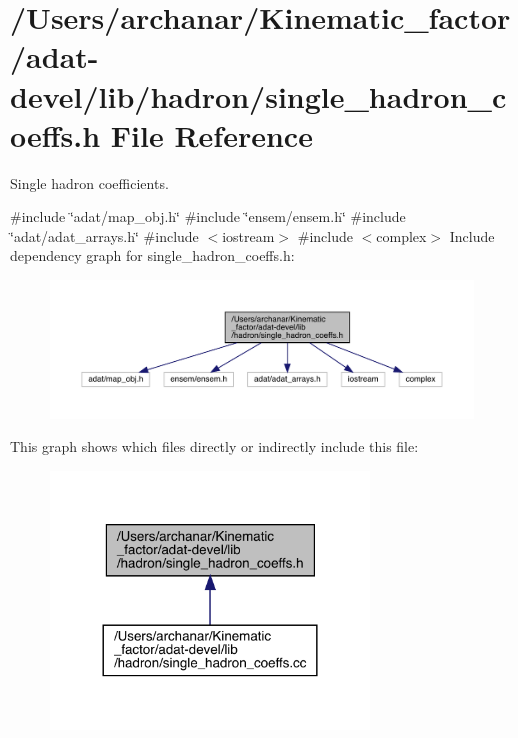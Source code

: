 \hypertarget{adat-devel_2lib_2hadron_2single__hadron__coeffs_8h}{}\section{/\+Users/archanar/\+Kinematic\+\_\+factor/adat-\/devel/lib/hadron/single\+\_\+hadron\+\_\+coeffs.h File Reference}
\label{adat-devel_2lib_2hadron_2single__hadron__coeffs_8h}


Single hadron coefficients.  


{\ttfamily \#include \char`\"{}adat/map\+\_\+obj.\+h\char`\"{}}\newline
{\ttfamily \#include \char`\"{}ensem/ensem.\+h\char`\"{}}\newline
{\ttfamily \#include \char`\"{}adat/adat\+\_\+arrays.\+h\char`\"{}}\newline
{\ttfamily \#include $<$iostream$>$}\newline
{\ttfamily \#include $<$complex$>$}\newline
Include dependency graph for single\+\_\+hadron\+\_\+coeffs.\+h\+:
\nopagebreak
\begin{figure}[H]
\begin{center}
\leavevmode
\includegraphics[width=350pt]{d3/d8f/adat-devel_2lib_2hadron_2single__hadron__coeffs_8h__incl}
\end{center}
\end{figure}
This graph shows which files directly or indirectly include this file\+:
\nopagebreak
\begin{figure}[H]
\begin{center}
\leavevmode
\includegraphics[width=240pt]{d5/d8e/adat-devel_2lib_2hadron_2single__hadron__coeffs_8h__dep__incl}
\end{center}
\end{figure}
